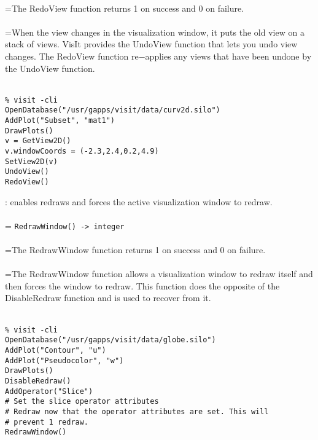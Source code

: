 \documentclass[10pt,a4paper]{report}
\begin{document}
 \\ 
\hangindent=\parindent The RedoView function returns 1 on success and 0 on failure. \\[-3mm] 

 \\ 
\hangindent=\parindent When the view changes in the visualization window, it puts the old view on a stack of views. VisIt provides the UndoView function that lets you undo view changes. The RedoView function re$-$applies any views that have been undone by the UndoView function. \\[-3mm] 

\\[-6mm]
\begin{verbatim}% visit -cli
OpenDatabase("/usr/gapps/visit/data/curv2d.silo")
AddPlot("Subset", "mat1")
DrawPlots()
v = GetView2D()
v.windowCoords = (-2.3,2.4,0.2,4.9)
SetView2D(v)
UndoView()
RedoView()
\end{verbatim}
\newpage


{}
: enables redraws and forces the active visualization window to redraw.\\[-3mm]

 \\ 
\hangindent=\parindent 
\verb!RedrawWindow() -> integer!\\ [-3mm]

 \\ 
\hangindent=\parindent The RedrawWindow function returns 1 on success and 0 on failure. \\[-3mm] 

 \\ 
\hangindent=\parindent The RedrawWindow function allows a visualization window to redraw itself and then forces the window to redraw. This function does the opposite of the DisableRedraw function and is used to recover from it. \\[-3mm] 

\\[-6mm]
\begin{verbatim}% visit -cli
OpenDatabase("/usr/gapps/visit/data/globe.silo")
AddPlot("Contour", "u")
AddPlot("Pseudocolor", "w")
DrawPlots()
DisableRedraw()
AddOperator("Slice")
# Set the slice operator attributes
# Redraw now that the operator attributes are set. This will 
# prevent 1 redraw.
RedrawWindow()
\end{verbatim}
\newpage
\end{document}
